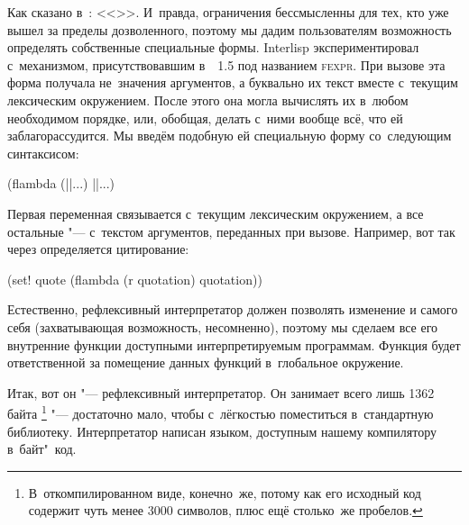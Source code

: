 Как сказано в~\cite{chr95}: <<>>. И~правда, ограничения бессмысленны для тех, кто уже
вышел за пределы дозволенного, поэтому мы дадим пользователям возможность
определять собственные специальные формы. Interlisp экспериментировал
с~механизмом, присутствовавшим в~\LISP~1.5 под названием \textsc{fexpr}. При
вызове эта форма получала не~значения аргументов, а буквально их текст вместе
с~текущим лексическим окружением. После этого она могла вычислять их в~любом
необходимом порядке, или, обобщая, делать с~ними вообще всё, что ей
заблагорассудится. Мы введём подобную ей специальную форму 
со~следующим синтаксисом:

\begin{code:lisp}
(flambda (||...) ||...)
\end{code:lisp}

Первая переменная связывается с~текущим лексическим окружением, а все остальные
"--- с~текстом аргументов, переданных при вызове. Например, вот так через
 определяется цитирование:

\begin{code:lisp}
(set! quote (flambda (r quotation) quotation))
\end{code:lisp}

Естественно, рефлексивный интерпретатор должен позволять изменение и самого себя
(захватывающая возможность, несомненно), поэтому мы сделаем все его внутренние
функции доступными интерпретируемым программам. Функция 
будет ответственной за помещение данных функций в~глобальное окружение.

Итак, вот он "--- рефлексивный интерпретатор. Он занимает всего лишь 1362 байта%
\footnote*{В~откомпилированном виде, конечно~же, потому как его исходный код
содержит чуть менее 3000 символов, плюс ещё столько~же пробелов.} "---
достаточно мало, чтобы с~лёгкостью поместиться в~стандартную библиотеку.
Интерпретатор написан языком, доступным нашему компилятору в~байт"~код.

